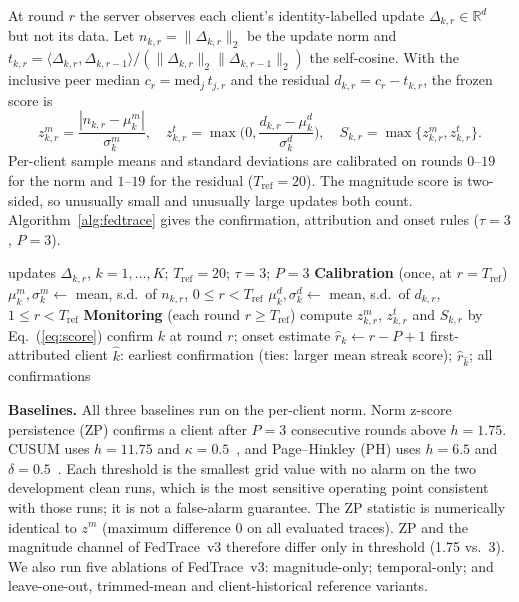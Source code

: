 \documentclass{article}
\newcommand{\vthree}{FedTrace~v3}
\begin{document}
At round $r$ the server observes each client's identity-labelled update $\Delta_{k,r}\in\mathbb{R}^d$ but not its
data. Let $n_{k,r}=\|\Delta_{k,r}\|_2$ be the update norm and
$t_{k,r}=\langle\Delta_{k,r},\Delta_{k,r-1}\rangle/(\|\Delta_{k,r}\|_2\|\Delta_{k,r-1}\|_2)$ the self-cosine. With
the inclusive peer median $c_r=\mathrm{med}_j\,t_{j,r}$ and the residual $d_{k,r}=c_r-t_{k,r}$, the frozen score is
\begin{equation}
z^m_{k,r}=\frac{|n_{k,r}-\mu^m_k|}{\sigma^m_k},\quad
z^t_{k,r}=\max\Big(0,\frac{d_{k,r}-\mu^d_k}{\sigma^d_k}\Big),\quad
S_{k,r}=\max\{z^m_{k,r},z^t_{k,r}\}.
\label{eq:score}
\end{equation}
Per-client sample means and standard deviations are calibrated on rounds $0$--$19$ for the norm and $1$--$19$ for
the residual ($T_{\mathrm{ref}}=20$). The magnitude score is two-sided, so unusually small and unusually large
updates both count. Algorithm~\ref{alg:fedtrace} gives the confirmation, attribution and onset rules ($\tau=3$,
$P=3$).

\begin{algorithm}[t]
\small
\caption{\vthree{} forensic monitor (frozen; evaluated, not proposed)}
\label{alg:fedtrace}
\begin{algorithmic}[1]
\Require updates $\Delta_{k,r}$, $k=1,\dots,K$; $T_{\mathrm{ref}}=20$; $\tau=3$; $P=3$
\Statex \textbf{Calibration} (once, at $r=T_{\mathrm{ref}}$)
  \State $\mu^m_k,\sigma^m_k\gets$ mean, s.d.\ of $n_{k,r}$, $0\le r<T_{\mathrm{ref}}$
  \State $\mu^d_k,\sigma^d_k\gets$ mean, s.d.\ of $d_{k,r}$, $1\le r<T_{\mathrm{ref}}$
\EndFor
\Statex \textbf{Monitoring} (each round $r\ge T_{\mathrm{ref}}$)
  \State compute $z^m_{k,r}$, $z^t_{k,r}$ and $S_{k,r}$ by Eq.~(\ref{eq:score})
    \State confirm $k$ at round $r$; onset estimate $\hat r_k\gets r-P+1$
  \EndIf
\EndFor
\State \Return first-attributed client $\hat k$: earliest confirmation (ties: larger mean streak score); $\hat r_{\hat k}$; all confirmations
\end{algorithmic}
\end{algorithm}

\textbf{Baselines.} All three baselines run on the per-client norm. Norm z-score persistence (ZP) confirms a
client after $P=3$ consecutive rounds above $h=1.75$. CUSUM uses $h=11.75$ and $\kappa=0.5$~\cite{page1954cusum},
and Page--Hinkley (PH) uses $h=6.5$ and $\delta=0.5$~\cite{hinkley1971changepoint}. Each threshold is the smallest
grid value with no alarm on the two development clean runs, which is the most sensitive operating point consistent
with those runs; it is not a false-alarm guarantee. The ZP statistic is numerically identical to $z^m$ (maximum
difference 0 on all evaluated traces). ZP and the magnitude channel of \vthree{} therefore differ only in threshold
(1.75 vs.\ 3). We also run five ablations of \vthree: magnitude-only; temporal-only; and leave-one-out,
trimmed-mean and client-historical reference variants.
\end{document}
